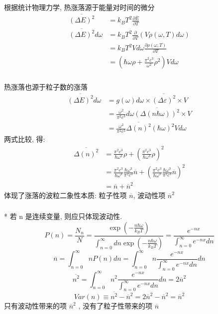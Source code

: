    \begin{frame} 
    \frametitle{}
     根据统计物理力学, 热涨落源于能量对时间的微分
    \[\begin{aligned}
        \overline{ (\Delta E)^2 }  &= k_B T^2 \frac{\partial \overline{E} }{\partial T } \\ 
        \overline{ (\Delta E)^2 } d \omega &= k_B T^2 \frac{\partial  }{\partial T } (V \rho(\omega, T)  d \omega)  \\
   &= k_B T^2 V d \omega \frac{\partial \rho(\omega, T) }{\partial T } \\ 
   &= (\hbar \omega \rho  + \frac{\pi ^2 c^{3}}{\omega ^2} \rho^2) V d \omega
    \end{aligned} \]    
   \end{frame}

   \begin{frame} 
    \frametitle{}
    热涨落也源于粒子数的涨落
    \[\begin{aligned}
        \overline{ (\Delta E)^2 } d \omega &= g(\omega)d \omega \times \overline{ (\Delta \varepsilon)^2 } \times V \\ 
        &= \frac{ \omega ^2}{\pi ^2 c^{3}} d \omega \overline{ (\Delta (n\hbar \omega))^2 } \times V \\ 
        &= \frac{ \omega ^2}{\pi ^2 c^{3}} \overline{ \Delta (n)^2 } (\hbar \omega)^2 V d \omega 
    \end{aligned} \]  
    两式比较, 得:
    \[\begin{aligned}
        \overline{ \Delta (n)^2 } &=  \frac{\pi ^2 c^{3}}{\hbar \omega ^3}\rho + (\frac{\pi ^2 c^{3}}{\hbar \omega ^3}\rho )^2 \\ 
        &=  \frac{\pi ^2 c^{3}}{\hbar \omega ^3} \frac{\hbar \omega ^3}{\pi ^2 c^{3}} \overline{n}  + (\frac{\pi ^2 c^{3}}{\hbar \omega ^3}\frac{\hbar \omega ^3}{\pi ^2 c^{3}} \overline{n}  )^2 \\ 
        &= \overline{n} + \overline{n}^2
    \end{aligned} \]
    体现了涨落的波粒二象性本质: 粒子性项 $\overline{ n }$,  波动性项 $\overline{ n }^2$ 
   \end{frame}

   \begin{frame} 
    \frametitle{}
    * 若 n 是连续变量, 则应只体现波动性. 
    \[  P(n) =\frac{N_{n}}{N}=\frac{\exp \left(-\frac{n\hbar \omega }{k_B T}\right)}{ \int_{n=0} ^\infty dn \exp \left(-\frac{n\hbar \omega}{k_B T}\right)} = \frac{e^{-nx}}{\int_{n=0} ^\infty  e^{-nx} dn}\]
    \[ \overline{n } = \int_{n=0} ^\infty n P(n)  dn = \int_{n=0} ^\infty n \frac{e^{-nx}}{\int_{n=0} ^\infty  e^{-nx}dn}  dn\]
    \[ \overline{n^2 } = \int_{n=0} ^\infty n^2 \frac{e^{-nx}}{\int_{n=0} ^\infty  e^{-nx}dn}  dn = 2 \overline{n }^2 \]
    \[ Var(n) \equiv \overline{ n^2 } - \overline{ n }^2  = 2\overline{ n }^2 - \overline{ n }^2 = \overline{ n }^2 \] 
    只有波动性带来的项 $\overline{ n }^2$ , 没有了粒子性带来的项 $\overline{ n }$  
\end{frame}

